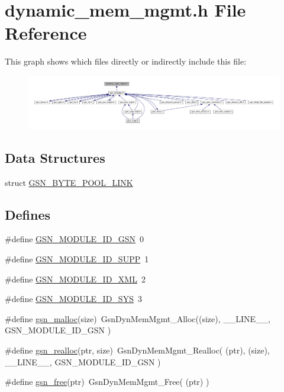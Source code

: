 \hypertarget{a00470}{
\section{dynamic\_\-mem\_\-mgmt.h File Reference}
\label{a00470}
}
This graph shows which files directly or indirectly include this file:
\nopagebreak
\begin{figure}[H]
\begin{center}
\leavevmode
\includegraphics[width=400pt]{a00694}
\end{center}
\end{figure}
\subsection*{Data Structures}
\begin{DoxyCompactItemize}
\item 
struct \hyperlink{a00035}{GSN\_\-BYTE\_\-POOL\_\-LINK}
\end{DoxyCompactItemize}
\subsection*{Defines}
\begin{DoxyCompactItemize}
\item 
\#define \hyperlink{a00470_a57fe2cbc87c8a8968fb5cfd3980e13dd}{GSN\_\-MODULE\_\-ID\_\-GSN}~0
\item 
\#define \hyperlink{a00470_a56aaa4e1db3b5248ff786effd8467fc3}{GSN\_\-MODULE\_\-ID\_\-SUPP}~1
\item 
\#define \hyperlink{a00470_a9365447f72eb5c602d2df9416aa852ec}{GSN\_\-MODULE\_\-ID\_\-XML}~2
\item 
\#define \hyperlink{a00470_af9a1d7cd4969afd142249c59cf597610}{GSN\_\-MODULE\_\-ID\_\-SYS}~3
\item 
\#define \hyperlink{a00470_a99a1ae5556d5b2f1372242586773ea51}{gsn\_\-malloc}(size)~GsnDynMemMgmt\_\-Alloc((size), \_\-\_\-LINE\_\-\_\-, GSN\_\-MODULE\_\-ID\_\-GSN )
\item 
\#define \hyperlink{a00470_acbbd85dc352dcc61b2e8008043063bda}{gsn\_\-realloc}(ptr, size)~GsnDynMemMgmt\_\-Realloc( (ptr), (size), \_\-\_\-LINE\_\-\_\-, GSN\_\-MODULE\_\-ID\_\-GSN )
\item 
\#define \hyperlink{a00470_a46d4cefce1e68b2b2da71a49ed73321f}{gsn\_\-free}(ptr)~GsnDynMemMgmt\_\-Free( (ptr) )
\end{DoxyCompactItemize}
